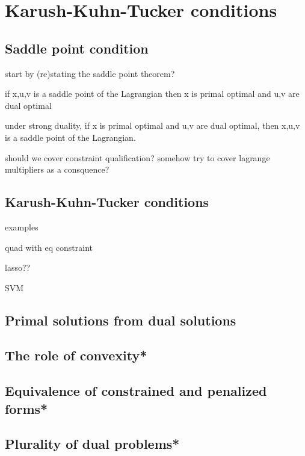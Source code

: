 \chapter{Karush-Kuhn-Tucker conditions}
\label{chap:kkt_conditions}

\section{Saddle point condition}
\label{sec:saddle_point_conditions}


start by (re)stating the saddle point theorem?

if x,u,v is a saddle point of the Lagrangian then x is primal optimal and u,v
are dual optimal

under strong duality, if x is primal optimal and u,v are dual optimal, then
x,u,v is a saddle point of the Lagrangian.

should we cover constraint qualification? 
somehow try to cover lagrange multipliers as a consquence?

\section{Karush-Kuhn-Tucker conditions}
\label{sec:kkt_conditions}

examples

quad with eq constraint

lasso??


SVM


\section{Primal solutions from dual solutions}

\section{The role of convexity*}

\section{Equivalence of constrained and penalized forms*}

\section{Plurality of dual problems*}
\label{sec:plurality_dual_problems}

